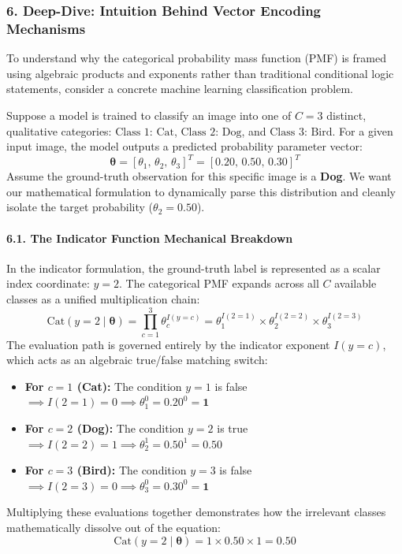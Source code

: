 \documentclass{article}
\begin{document}
\subsubsection*{6. Deep-Dive: Intuition Behind Vector Encoding Mechanisms}

To understand why the categorical probability mass function (PMF) is framed using algebraic products and exponents rather than traditional conditional logic statements, consider a concrete machine learning classification problem.

Suppose a model is trained to classify an image into one of $C=3$ distinct, qualitative categories: $\text{Class 1: Cat}$, $\text{Class 2: Dog}$, and $\text{Class 3: Bird}$. For a given input image, the model outputs a predicted probability parameter vector:
\begin{equation}
    \boldsymbol{\theta} = [\theta_1, \, \theta_2, \, \theta_3]^T = [0.20, \, 0.50, \, 0.30]^T
\end{equation}
Assume the ground-truth observation for this specific image is a \textbf{Dog}. We want our mathematical formulation to dynamically parse this distribution and cleanly isolate the target probability ($\theta_2 = 0.50$).

\paragraph{6.1. The Indicator Function Mechanical Breakdown}
In the indicator formulation, the ground-truth label is represented as a scalar index coordinate: $y = 2$. The categorical PMF expands across all $C$ available classes as a unified multiplication chain:
\begin{equation}
    \text{Cat}(y=2 \mid \boldsymbol{\theta}) = \prod_{c=1}^{3} \theta_c^{I(y = c)} = \theta_1^{I(2=1)} \times \theta_2^{I(2=2)} \times \theta_3^{I(2=3)}
\end{equation}
The evaluation path is governed entirely by the indicator exponent $I(y=c)$, which acts as an algebraic true/false matching switch:
\begin{itemize}
    \item \textbf{For $c=1$ (Cat):} The condition $y=1$ is false $\implies I(2=1) = 0 \implies \theta_1^0 = 0.20^0 = \mathbf{1}$
    \item \textbf{For $c=2$ (Dog):} The condition $y=2$ is true $\implies I(2=2) = 1 \implies \theta_2^1 = 0.50^1 = \mathbf{0.50}$
    \item \textbf{For $c=3$ (Bird):} The condition $y=3$ is false $\implies I(2=3) = 0 \implies \theta_3^0 = 0.30^0 = \mathbf{1}$
\end{itemize}
Multiplying these evaluations together demonstrates how the irrelevant classes mathematically dissolve out of the equation:
\begin{equation}
    \text{Cat}(y=2 \mid \boldsymbol{\theta}) = 1 \times 0.50 \times 1 = \mathbf{0.50}
\end{equation}
\end{document}

